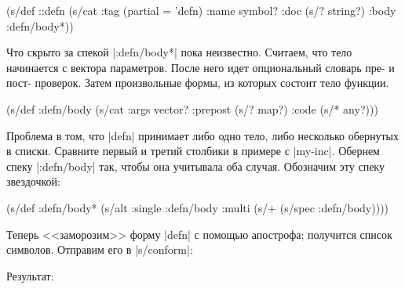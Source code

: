 \begin{english}
  \begin{clojure}
(s/def ::defn
  (s/cat :tag (partial = 'defn)
         :name symbol?
         :doc (s/? string?)
         :body :defn/body*))
  \end{clojure}
\end{english}

Что скрыто за спекой \spverb|:defn/body*| пока неизвестно. Считаем, что тело
начинается с вектора параметров. После него идет опциональный словарь пре- и
пост- проверок. Затем произвольные формы, из которых состоит тело функции.

\begin{english}
  \begin{clojure}
(s/def :defn/body
  (s/cat :args vector?
         :prepost (s/? map?)
         :code (s/* any?)))
  \end{clojure}
\end{english}

Проблема в том, что \spverb|defn| принимает либо одно тело, либо несколько
обернутых в списки. Сравните первый и третий столбики в примере с
\spverb|my-inc|. Обернем спеку \spverb|:defn/body| так, чтобы она учитывала оба
случая. Обозначим эту спеку звездочкой:

\begin{english}
  \begin{clojure}
(s/def :defn/body*
  (s/alt :single :defn/body
         :multi (s/+ (s/spec :defn/body))))
  \end{clojure}
\end{english}

Теперь <<заморозим>> форму \spverb|defn| с помощью апострофа; получится список
символов. Отправим его в \spverb|s/conform|:

\begin{english}
\end{english}

\noindent
Результат:

\begin{english}
\end{english}

